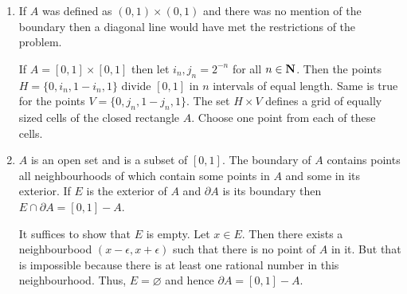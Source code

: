 \begin{enumerate}
\item If $A$ was defined as $(0, 1) \times (0, 1)$ and there was no mention of
the boundary then a diagonal line would have met the restrictions of the 
problem.

If $A = [0, 1] \times [0, 1]$ then let $i_n, j_n = 2^{-n}$ for all $n \in \mathbf{N}$.
Then the points $H=\{0, i_n, 1 - i_n, 1\}$ divide $[0, 1]$ in $n$ intervals of
equal length. Same is true for the points $V = \{0, j_n, 1 - j_n, 1\}$. The
set $H \times V$ defines a grid of equally sized cells of the closed rectangle
 $A$. Choose one point from each of these cells.

\item $A$ is an open set and is a subset of $[0, 1]$. The boundary of $A$
contains points all neighbourhoods of which contain some points in $A$ and
some in its exterior. If $E$ is the exterior of $A$ and $\partial A$ is its
boundary then $E \cap \partial A = [0, 1] - A$.

It suffices to show that $E$ is empty. Let $x \in E$. Then there exists a
neighbourbood $(x - \epsilon, x + \epsilon)$ such that there is no point of
$A$ in it. But that is impossible because there is at least one rational number
in this neighbourhood. Thus, $E = \varnothing$ and hence $\partial A = [0, 1]
- A$.

\end{enumerate}

